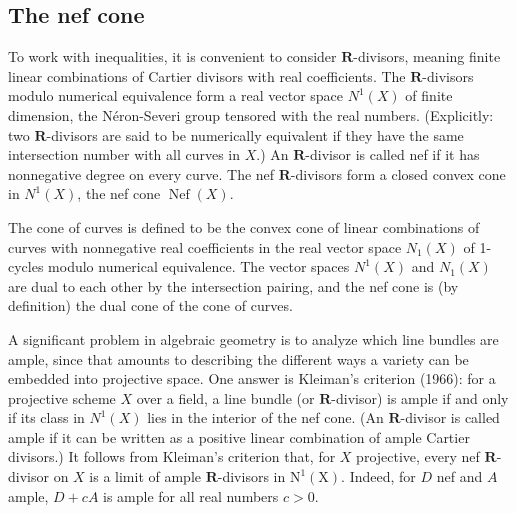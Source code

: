 \documentclass[lang=en,12pt]{beautybook}
\begin{document}
\subsection*{The nef cone}

To work with inequalities, it is convenient to consider $\mathbf{R}$-divisors, meaning finite linear combinations of Cartier divisors with real coefficients. The $\mathbf{R}$-divisors modulo numerical equivalence form a real vector space $N^1(X)$ of finite dimension, the Néron-Severi group tensored with the real numbers.  (Explicitly: two $\mathbf{R}$-divisors are said to be numerically equivalent if they have the same intersection number with all curves in $X$.) An $\mathbf{R}$-divisor is called nef if it has nonnegative degree on every curve. The nef $\mathbf{R}$-divisors form a closed convex cone in $N^1(X)$, the nef cone $\operatorname{Nef}(X)$.

The cone of curves is defined to be the convex cone of linear combinations of curves with nonnegative real coefficients in the real vector space $N_1(X)$ of 1-cycles modulo numerical equivalence. The vector spaces $N^1(X)$ and $N_1(X)$ are dual to each other by the intersection pairing, and the nef cone is (by definition) the dual cone of the cone of curves.

A significant problem in algebraic geometry is to analyze which line bundles are ample, since that amounts to describing the different ways a variety can be embedded into projective space. One answer is Kleiman's criterion (1966): for a projective scheme $X$ over a field, a line bundle (or $\mathbf{R}$-divisor) is ample if and only if its class in $N^1(X)$ lies in the interior of the nef cone.  (An $\mathbf{R}$-divisor is called ample if it can be written as a positive linear combination of ample Cartier divisors.) It follows from Kleiman's criterion that, for $X$ projective, every nef $\mathbf{R}$-divisor on $X$ is a limit of ample $\mathbf{R}$-divisors in $\mathrm{N}^1(\mathrm{X})$. Indeed, for $D$ nef and $A$ ample, $D+c A$ is ample for all real numbers $c>0$.
\end{document}
